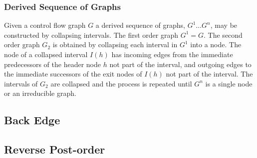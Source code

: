 
\subsubsection{Derived Sequence of Graphs}

Given a control flow graph $G$ a derived sequence of graphs, $G^1 \dots G^n$, may be constructed by collapsing intervals. The first order graph $G^1 = G$. The second order graph $G_2$ is obtained by collapsing each interval in $G^1$ into a node. The node of a collapsed interval $I(h)$ has incoming edges from the immediate predecessors of the header node $h$ not part of the interval, and outgoing edges to the immediate successors of the exit nodes of $I(h)$ not part of the interval. The intervals of $G_2$ are collapsed and the process is repeated until $G^n$ is a single node or an irreducible graph.



\subsection{Back Edge}



\subsection{Reverse Post-order}

